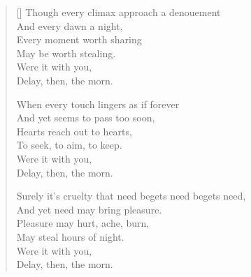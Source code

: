 \begin{verse}[\textwidth]
  Though every climax approach a denouement\\
  And every dawn a night,\\
  Every moment worth sharing\\
  May be worth stealing.\\
  \vin Were it with you,\\
  \vin Delay, then, the morn.

  When every touch lingers as if forever\\
  And yet seems to pass too soon,\\
  Hearts reach out to hearts,\\
  To seek, to aim, to keep.\\
  \vin Were it with you,\\
  \vin Delay, then, the morn.

  Surely it's cruelty that need begets need begets need,\\
  And yet need may bring pleasure.\\
  Pleasure may hurt, ache, burn,\\
  May steal hours of night.\\
  \vin Were it with you,\\
  \vin Delay, then, the morn.
\end{verse}
